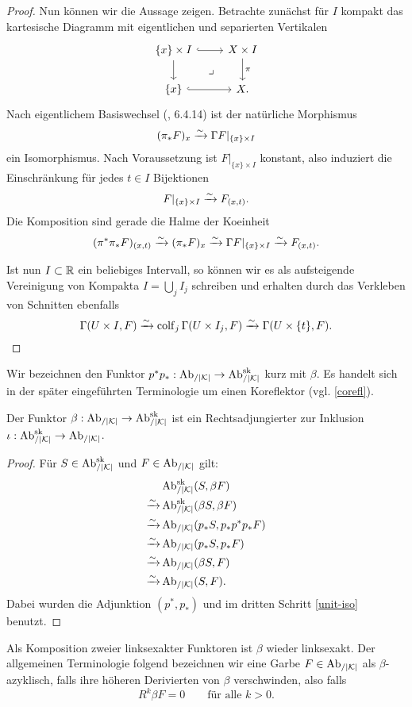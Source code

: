 \begin{proof}
  Nun können wir die Aussage zeigen. Betrachte zunächst für $I$
  kompakt das kartesische Diagramm mit eigentlichen und separierten
  Vertikalen 
  \[ \begin{tikzcd}
    \{x\} \times I \rar[hook] \dar \arrow[dr, phantom, "\lrcorner"]
    & X \times I \dar["\pi"] \\
    \{x\} \rar[hook]
    & X.
  \end{tikzcd} \]
  Nach eigentlichem Basiswechsel (\cite{TG}, 6.4.14) ist der
  natürliche Morphismus
  \[ (\pi_* F)_x \xrightarrow[]{\sim} \Gamma F|_{\{x\} \times I} \]
  ein Isomorphismus. Nach Voraussetzung ist $F|_{\{x\} \times I}$
  konstant, also induziert die Einschränkung für jedes $t \in I$
  Bijektionen
  \[ F|_{\{x\} \times I} \xrightarrow[]{\sim} F_{(x, t)}. \]
  Die Komposition sind gerade die Halme der Koeinheit
  \[ (\pi^* \pi_* F)_{(x, t)} \xrightarrow[]{\sim} (\pi_* F)_x
  \xrightarrow[]{\sim} \Gamma F|_{\{x\} \times I} \xrightarrow[]{\sim} F_{(x, t)}.
  \]

  Ist nun $I \subset \mathbb{R}$ ein beliebiges Intervall, so können wir es
  als aufsteigende Vereinigung von Kompakta $I = \bigcup_j I_j$
  schreiben und erhalten durch das Verkleben von Schnitten ebenfalls
  \[ \Gamma(U \times I, F)
  \xrightarrow[]{\sim} \operatorname{colf}_j \Gamma(U \times I_j, F)
  \xrightarrow[]{\sim} \Gamma(U \times \{t\}, F).
  \]
\end{proof}

Wir bezeichnen den Funktor $p^*p_*: \operatorname{Ab}_{/|\mathcal{K}|} \to \operatorname{Ab}_{/|\mathcal{K}|}^{\operatorname{sk}}$ kurz mit
$\beta$. Es handelt sich in der später eingeführten Terminologie um
einen Koreflektor (vgl. \ref{corefl}).
\begin{prop} \label{beta-adjoint}
  Der Funktor $\beta: \operatorname{Ab}_{/|\mathcal{K}|} \to \operatorname{Ab}_{/|\mathcal{K}|}^{\operatorname{sk}}$ ist ein Rechtsadjungierter
  zur Inklusion $\iota: \operatorname{Ab}_{/|\mathcal{K}|}^{\operatorname{sk}} \to \operatorname{Ab}_{/|\mathcal{K}|}$.
\end{prop}
\begin{proof}
  Für $S \in \operatorname{Ab}_{/|\mathcal{K}|}^{\operatorname{sk}}$ und $F \in \operatorname{Ab}_{/|\mathcal{K}|}$ gilt:
  \begin{align*}
    & \operatorname{Ab}_{/|\mathcal{K}|}^{\operatorname{sk}}(S, \beta F) \\
    \xrightarrow[]{\sim} & \operatorname{Ab}_{/|\mathcal{K}|}^{\operatorname{sk}}(\beta S, \beta F) \\
    \xrightarrow[]{\sim} & \operatorname{Ab}_{/|\mathcal{K}|}(p_* S, p_* p^* p_* F) \\
    \xrightarrow[]{\sim} & \operatorname{Ab}_{/|\mathcal{K}|}(p_* S, p_* F) \\
    \xrightarrow[]{\sim} & \operatorname{Ab}_{/|\mathcal{K}|}(\beta S, F) \\
    \xrightarrow[]{\sim} & \operatorname{Ab}_{/|\mathcal{K}|}(S, F).
  \end{align*}
  Dabei wurden die Adjunktion $(p^*, p_*)$ und im dritten Schritt
  \ref{unit-iso} benutzt.
\end{proof}

Als Komposition zweier linksexakter Funktoren ist $\beta$ wieder
linksexakt. Der allgemeinen Terminologie folgend bezeichnen wir eine
Garbe $F \in \operatorname{Ab}_{/|\mathcal{K}|}$ als $\beta$-azyklisch, falls ihre höheren
Derivierten von $\beta$ verschwinden, also falls
\[ R^k\beta F = 0 \qquad \text{für alle } k > 0.  \]

